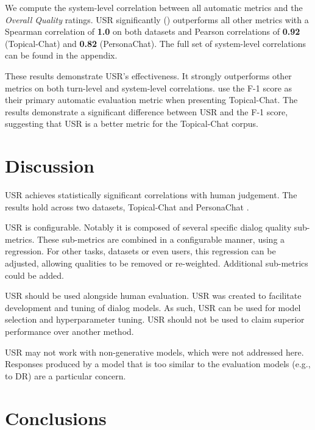 \documentclass[11pt,a4paper]{article}
\begin{document}
We compute the system-level correlation between all automatic metrics and the \textit{Overall Quality} ratings. USR significantly () outperforms all other metrics with a Spearman correlation of \textbf{1.0} on both datasets and Pearson correlations of \textbf{0.92} (Topical-Chat) and \textbf{0.82} (PersonaChat). The full set of system-level correlations can be found in the appendix.


These results demonstrate USR's effectiveness. It strongly outperforms other metrics on both turn-level and system-level correlations. \citet{gopalakrishnan2019topical} use the F-1 score as their primary automatic evaluation metric when presenting Topical-Chat. The results demonstrate a significant difference between USR and the F-1 score, suggesting that USR is a better metric for the Topical-Chat corpus. 









\section{Discussion}
USR achieves statistically significant correlations with human judgement. The results hold across two datasets, Topical-Chat \citep{gopalakrishnan2019topical} and PersonaChat \citep{zhang2018personalizing}. 

USR is configurable. Notably it is composed of several specific dialog quality sub-metrics. These sub-metrics are combined in a configurable manner, using a regression. For other tasks, datasets or even users, this regression can be adjusted, allowing qualities to be removed or re-weighted. Additional sub-metrics could be added.


USR should be used alongside human evaluation. USR was created to facilitate development and tuning of dialog models. As such, USR can be used for model selection and hyperparameter tuning. USR should not be used to claim superior performance over another method.

USR may not work with non-generative models, which were not addressed here. Responses produced by a model that is too similar to the evaluation models (e.g., to DR) are a particular concern.

\section{Conclusions}
\end{document}
